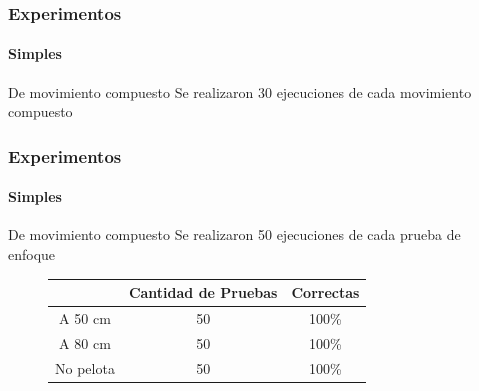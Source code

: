 \documentclass{beamer}
\begin{document}
\begin{frame}
\frametitle{Experimentos}
\framesubtitle{Simples}
\begin{block} {De movimiento compuesto}
Se realizaron 30 ejecuciones de cada movimiento compuesto
\end{block}

\begin{figure}[scale = 0.1]
\centering
\end{figure}

\end{frame}
\begin{frame}
\frametitle{Experimentos}
\framesubtitle{Simples}
\begin{block} {De movimiento compuesto}
Se realizaron 50 ejecuciones de cada prueba de enfoque
\end{block}

\begin{figure}[scale = 0.1]
\centering
\begin{tabular}{|c|c|c|}
 \hline 
  & Cantidad de Pruebas & Correctas \\ 
 \hline 
 A 50 cm & 50 & 100\% \\ 
 \hline 
 A 80 cm & 50 & 100\% \\ 
 \hline 
 No pelota & 50 & 100\% \\ 
  \hline 

 \end{tabular}  
\end{figure}

\end{frame}
\end{document}
